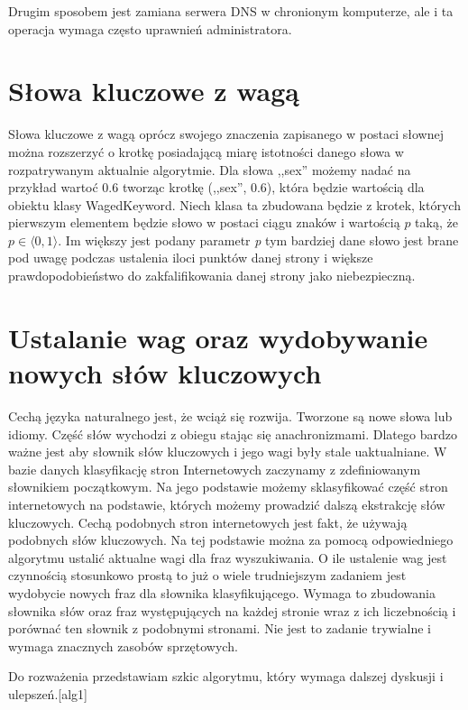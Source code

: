 \documentclass[9pt,twoside,a4paper]{article}
\begin{document}
Drugim sposobem jest zamiana serwera DNS w chronionym komputerze, ale i ta operacja wymaga często uprawnień administratora.
	
\section{Słowa kluczowe z wagą}
Słowa kluczowe z wagą oprócz swojego znaczenia zapisanego w postaci słownej można rozszerzyć o krotkę posiadającą miarę istotności danego słowa w rozpatrywanym aktualnie algorytmie. Dla słowa ,,sex'' możemy nadać na przykład wartoć 0.6 tworząc krotkę (,,sex'', 0.6), która będzie wartością dla obiektu klasy WagedKeyword. Niech klasa ta zbudowana będzie z krotek, których pierwszym elementem będzie słowo w postaci ciągu znaków i wartością \(p\) taką, że \(p \in \langle 0,1\rangle\). Im większy jest podany parametr \textit{p} tym bardziej dane słowo jest brane pod uwagę podczas ustalenia iloci punktów danej strony i większe prawdopodobieństwo do zakfalifikowania danej strony jako niebezpieczną.

\section{Ustalanie wag oraz wydobywanie nowych słów kluczowych}
Cechą języka naturalnego jest, że wciąż się rozwija. Tworzone są nowe słowa lub idiomy. Część słów wychodzi z obiegu stając się anachronizmami. Dlatego bardzo ważne jest aby słownik słów kluczowych i jego wagi były stale uaktualniane. W bazie danych klasyfikację stron Internetowych zaczynamy z zdefiniowanym słownikiem początkowym. Na jego podstawie możemy sklasyfikować część stron internetowych na podstawie, których możemy prowadzić dalszą ekstrakcję słów kluczowych. Cechą podobnych stron internetowych jest fakt, że używają podobnych słów kluczowych. Na tej podstawie można za pomocą odpowiedniego algorytmu ustalić aktualne wagi dla fraz wyszukiwania. O ile ustalenie wag jest czynnością stosunkowo prostą to już o wiele trudniejszym zadaniem jest wydobycie nowych fraz dla słownika klasyfikującego. Wymaga to zbudowania słownika słów oraz fraz występujących na każdej stronie wraz z ich liczebnością i porównać ten słownik z podobnymi stronami. Nie jest to zadanie trywialne i wymaga znacznych zasobów sprzętowych.

Do rozważenia przedstawiam szkic algorytmu, który wymaga dalszej dyskusji i ulepszeń.[alg1] 
\end{document}
